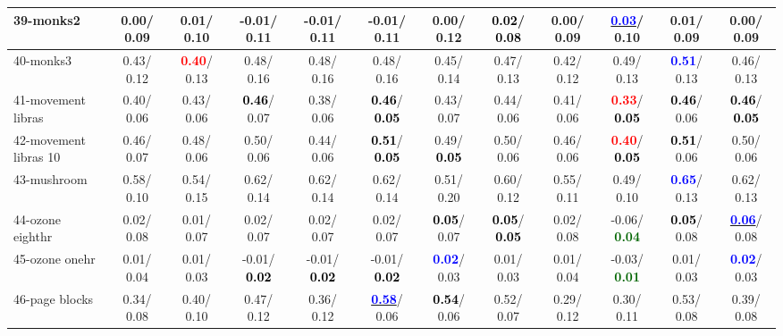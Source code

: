 \begin{table}[h]
\begin{center}
{\begin{tabular}{lc|c|c|c|c|c|c|c|c|c|c}
39-monks2 &   0.00/  0.09 &   0.01/  0.10 &  -0.01/  0.11 &  -0.01/  0.11 &  -0.01/  0.11 &   0.00/  0.12 & \textcolor{black}{\textbf{  0.02}}/\textcolor{black}{\textbf{  0.08}} &   0.00/  0.09 & \underline{\textcolor{blue}{\textbf{  0.03}}}/  0.10 &   0.01/  0.09 &   0.00/  0.09 \\ \hline
40-monks3 &   0.43/  0.12 & \textcolor{red}{\textbf{  0.40}}/  0.13 &   0.48/  0.16 &   0.48/  0.16 &   0.48/  0.16 &   0.45/  0.14 &   0.47/  0.13 &   0.42/  0.12 &   0.49/  0.13 & \textcolor{blue}{\textbf{  0.51}}/  0.13 &   0.46/  0.13 \\
41-movement libras &   0.40/  0.06 &   0.43/  0.06 & \textcolor{black}{\textbf{  0.46}}/  0.07 &   0.38/  0.06 & \textcolor{black}{\textbf{  0.46}}/\textcolor{black}{\textbf{  0.05}} &   0.43/  0.07 &   0.44/  0.06 &   0.41/  0.06 & \textcolor{red}{\textbf{  0.33}}/\textcolor{black}{\textbf{  0.05}} & \textcolor{black}{\textbf{  0.46}}/  0.06 & \textcolor{black}{\textbf{  0.46}}/\textcolor{black}{\textbf{  0.05}} \\
42-movement libras 10 &   0.46/  0.07 &   0.48/  0.06 &   0.50/  0.06 &   0.44/  0.06 & \textcolor{black}{\textbf{  0.51}}/\textcolor{black}{\textbf{  0.05}} &   0.49/\textcolor{black}{\textbf{  0.05}} &   0.50/  0.06 &   0.46/  0.06 & \textcolor{red}{\textbf{  0.40}}/\textcolor{black}{\textbf{  0.05}} & \textcolor{black}{\textbf{  0.51}}/  0.06 &   0.50/  0.06 \\
43-mushroom &   0.58/  0.10 &   0.54/  0.15 &   0.62/  0.14 &   0.62/  0.14 &   0.62/  0.14 &   0.51/  0.20 &   0.60/  0.12 &   0.55/  0.11 &   0.49/  0.10 & \textcolor{blue}{\textbf{  0.65}}/  0.13 &   0.62/  0.13 \\
44-ozone eighthr &   0.02/  0.08 &   0.01/  0.07 &   0.02/  0.07 &   0.02/  0.07 &   0.02/  0.07 & \textcolor{black}{\textbf{  0.05}}/  0.07 & \textcolor{black}{\textbf{  0.05}}/\textcolor{black}{\textbf{  0.05}} &   0.02/  0.08 &  -0.06/\textcolor{darkgreen}{\textbf{  0.04}} & \textcolor{black}{\textbf{  0.05}}/  0.08 & \underline{\textcolor{blue}{\textbf{  0.06}}}/  0.08 \\
45-ozone onehr &   0.01/  0.04 &   0.01/  0.03 &  -0.01/\textcolor{black}{\textbf{  0.02}} &  -0.01/\textcolor{black}{\textbf{  0.02}} &  -0.01/\textcolor{black}{\textbf{  0.02}} & \textcolor{blue}{\textbf{  0.02}}/  0.03 &   0.01/  0.03 &   0.01/  0.04 &  -0.03/\textcolor{darkgreen}{\textbf{  0.01}} &   0.01/  0.03 & \textcolor{blue}{\textbf{  0.02}}/  0.03 \\
46-page blocks &   0.34/  0.08 &   0.40/  0.10 &   0.47/  0.12 &   0.36/  0.12 & \underline{\textcolor{blue}{\textbf{  0.58}}}/  0.06 & \textcolor{black}{\textbf{  0.54}}/  0.06 &   0.52/  0.07 &   0.29/  0.12 &   0.30/  0.11 &   0.53/  0.08 &   0.39/  0.08 \\ \hline

\end{tabular}}
\end{center}
\end{table}
